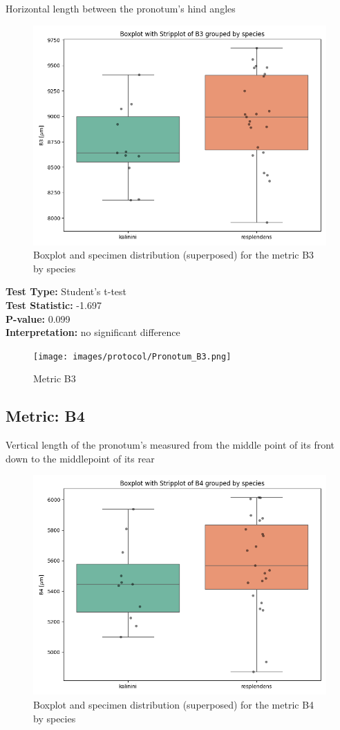 Horizontal length between the pronotum’s hind angles

\begin{figure}[H]
\centering
\includegraphics[width=0.7\linewidth]{images/boxplot/boxplot_B3.png}
\caption{  Boxplot and specimen distribution (superposed) for the metric  B3 by species}
\end{figure}

\noindent\textbf{Test Type:} Student's t-test \\
\noindent\textbf{Test Statistic:} -1.697 \\
\noindent\textbf{P-value:} 0.099 \\
\noindent\textbf{Interpretation:} no significant difference

\begin{figure}[H]
\centering
\texttt{[image: images/protocol/Pronotum\_B3.png]}
\caption{ Metric B3}
\end{figure}

\newpage
\subsection*{Metric: B4}

Vertical length of the pronotum’s measured from the middle point of its front down to the middlepoint of its rear

\begin{figure}[H]
\centering
\includegraphics[width=0.7\linewidth]{images/boxplot/boxplot_B4.png}
\caption{  Boxplot and specimen distribution (superposed) for the metric  B4 by species}
\end{figure}

